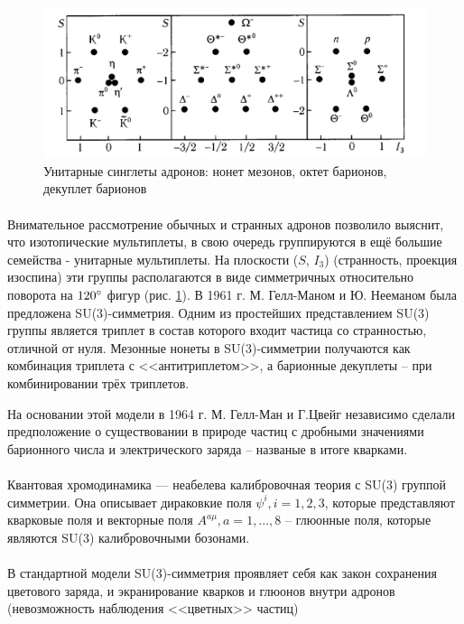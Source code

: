 \documentclass[a4paper,12pt]{article} %
\begin{document}
\begin{figure}[h]
\centering
\includegraphics[width=\textwidth]{unitary_singlets.png}
\caption{Унитарные синглеты адронов: нонет мезонов, октет барионов, декуплет барионов}
\label{fig:unitary_singlets}
\end{figure}

\paragraph{} Внимательное рассмотрение обычных и странных адронов позволило выяснит, что изотопические мультиплеты, в свою очередь группируются в ещё большие семейства - унитарные мультиплеты. На плоскости ($S$, $I_3$) (странность, проекция изоспина) эти группы располагаются в виде симметричных относительно поворота на $120\degree$ фигур (рис. \ref{fig:unitary_singlets}). В 1961 г. М. Гелл-Маном и Ю. Нееманом была предложена SU(3)-симметрия. Одним из простейших представлением SU(3) группы является триплет в состав которого входит частица со странностью, отличной от нуля. Мезонные нонеты в SU(3)-симметрии получаются как комбинация триплета с <<антитриплетом>>, а барионные декуплеты -- при комбинировании трёх триплетов.

На основании этой модели в 1964 г. М. Гелл-Ман и Г.Цвейг независимо сделали предположение о существовании в природе частиц с дробными значениями барионного числа и электрического заряда -- названые в итоге кварками.

\paragraph{} Квантовая хромодинамика — неабелева калибровочная теория с SU(3) группой симметрии. Она описывает дираковкие поля $\psi^i, i=1,2,3$, которые представляют кварковые поля и векторные поля $A^{a \mu}, a=1,...,8$ -- глюонные поля, которые являются SU(3) калибровочными бозонами.

\paragraph{} В стандартной модели SU(3)-симметрия проявляет себя как закон сохранения цветового заряда, и экранирование кварков и глюонов внутри адронов (невозможность наблюдения <<цветных>> частиц) 
\end{document}
